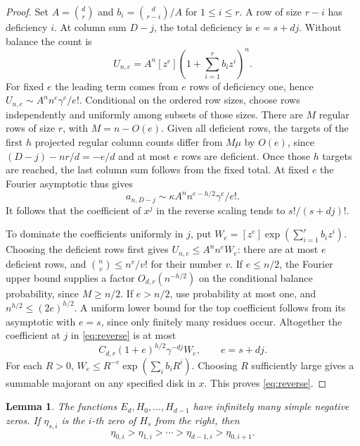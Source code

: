 \documentclass[11pt]{article}
\newtheorem{lemma}{Lemma}
\begin{document}
\begin{proof}
Set \(A=\binom dr\) and \(b_i=\binom d{r-i}/A\) for \(1\le i\le r\).
A row of size \(r-i\) has deficiency \(i\). At column sum \(D-j\),
the total deficiency is \(e=s+dj\). Without balance the count is
\[
U_{n,e}=A^n[z^e]\left(1+\sum_{i=1}^{r}b_i z^i\right)^n.
\]
For fixed \(e\) the leading term comes from \(e\) rows of deficiency
one, hence \(U_{n,e}\sim A^n n^e\gamma^e/e!\).
Conditional on the ordered row sizes, choose rows independently
and uniformly among subsets of those sizes. There are \(M\)
regular rows of size \(r\), with \(M=n-O(e)\). Given all deficient
rows, the targets of the first \(h\) projected regular column
counts differ from \(M\mu\) by \(O(e)\), since
\((D-j)-nr/d=-e/d\) and at most \(e\) rows are deficient.
Once those \(h\) targets are reached, the last column sum follows
from the fixed total. At fixed \(e\) the Fourier asymptotic thus
gives
\[
a_{n,D-j}\sim \kappa A^n n^{e-h/2}\gamma^e/e!.
\]
It follows that the coefficient of \(x^j\) in the reverse scaling
tends to \(s!/(s+dj)!\).

To dominate the coefficients uniformly in \(j\), put
\(W_e=[z^e]\exp(\sum_{i=1}^r b_i z^i)\).
Choosing the deficient rows first gives \(U_{n,e}\le A^n n^e W_e\):
there are at most \(e\) deficient rows, and
\(\binom n v\le n^v/v!\) for their number \(v\).
If \(e\le n/2\), the Fourier upper bound supplies a factor
\(O_{d,r}(n^{-h/2})\) on the conditional balance probability, since
\(M\ge n/2\). If \(e>n/2\), use probability at most one, and
\(n^{h/2}\le(2e)^{h/2}\).
A uniform lower bound for the top coefficient follows from its
asymptotic with \(e=s\), since only finitely many residues occur.
Altogether the coefficient at \(j\) in \eqref{eq:reverse} is at
most
\[
C_{d,r}(1+e)^{h/2}\gamma^{-dj}W_e,\qquad e=s+dj.
\]
For each \(R>0\), \(W_e\le R^{-e}\exp(\sum_i b_i R^i)\).
Choosing \(R\) sufficiently large gives a summable majorant on
any specified disk in \(x\). This proves \eqref{eq:reverse}.
\end{proof}

\begin{lemma}\label{lem:simple}
The functions \(E_d,H_0,\ldots,H_{d-1}\) have infinitely many
simple negative zeros. If \(\eta_{s,i}\) is the \(i\)-th zero
of \(H_s\) from the right, then
\[
\eta_{0,i}>\eta_{1,i}>\cdots>\eta_{d-1,i}>\eta_{0,i+1}.
\]
\end{lemma}
\end{document}
